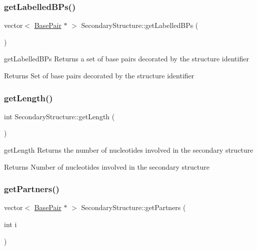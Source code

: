\subsubsection{\texorpdfstring{get\+Labelled\+B\+Ps()}{getLabelledBPs()}}
{\footnotesize\ttfamily vector$<$ \hyperlink{class_base_pair}{Base\+Pair} $\ast$ $>$ Secondary\+Structure\+::get\+Labelled\+B\+Ps (\begin{DoxyParamCaption}{ }\end{DoxyParamCaption})}



get\+Labelled\+B\+Ps Returns a set of base pairs decorated by the structure identifier 

\begin{DoxyReturn}{Returns}
Set of base pairs decorated by the structure identifier 
\end{DoxyReturn}
\mbox{\label{class_secondary_structure_a9c9c8a6a95cb900ebc1eb37113cd9215}} 
\subsubsection{\texorpdfstring{get\+Length()}{getLength()}}
{\footnotesize\ttfamily int Secondary\+Structure\+::get\+Length (\begin{DoxyParamCaption}{ }\end{DoxyParamCaption})}



get\+Length Returns the number of nucleotides involved in the secondary structure 

\begin{DoxyReturn}{Returns}
Number of nucleotides involved in the secondary structure 
\end{DoxyReturn}
\mbox{\label{class_secondary_structure_a6ef03f46376f3a79bd5345f357e96db6}} 
\subsubsection{\texorpdfstring{get\+Partners()}{getPartners()}}
{\footnotesize\ttfamily vector$<$ \hyperlink{class_base_pair}{Base\+Pair} $\ast$ $>$ Secondary\+Structure\+::get\+Partners (\begin{DoxyParamCaption}\item[{int}]{i }\end{DoxyParamCaption})}



